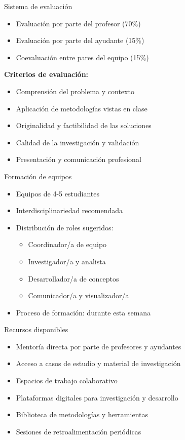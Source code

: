 \documentclass[10pt]{beamer}
\begin{document}
\begin{frame}{Sistema de evaluación}
    \begin{itemize}
        \item Evaluación por parte del profesor (70\%)
        \item Evaluación por parte del ayudante (15\%)
        \item Coevaluación entre pares del equipo (15\%)
    \end{itemize}
    
    \vspace{0.5cm}
    \textbf{Criterios de evaluación:}
    \begin{itemize}
        \item Comprensión del problema y contexto
        \item Aplicación de metodologías vistas en clase
        \item Originalidad y factibilidad de las soluciones
        \item Calidad de la investigación y validación
        \item Presentación y comunicación profesional
    \end{itemize}
\end{frame}

\begin{frame}{Formación de equipos}
    \begin{itemize}
        \item Equipos de 4-5 estudiantes
        \item Interdisciplinariedad recomendada
        \item Distribución de roles sugeridos:
        \begin{itemize}
            \item Coordinador/a de equipo
            \item Investigador/a y analista
            \item Desarrollador/a de conceptos
            \item Comunicador/a y visualizador/a
        \end{itemize}
        \item Proceso de formación: durante esta semana
    \end{itemize}
\end{frame}

\begin{frame}{Recursos disponibles}
    \begin{itemize}
        \item Mentoría directa por parte de profesores y ayudantes
        \item Acceso a casos de estudio y material de investigación
        \item Espacios de trabajo colaborativo
        \item Plataformas digitales para investigación y desarrollo
        \item Biblioteca de metodologías y herramientas
        \item Sesiones de retroalimentación periódicas
    \end{itemize}
\end{frame}
\end{document}
